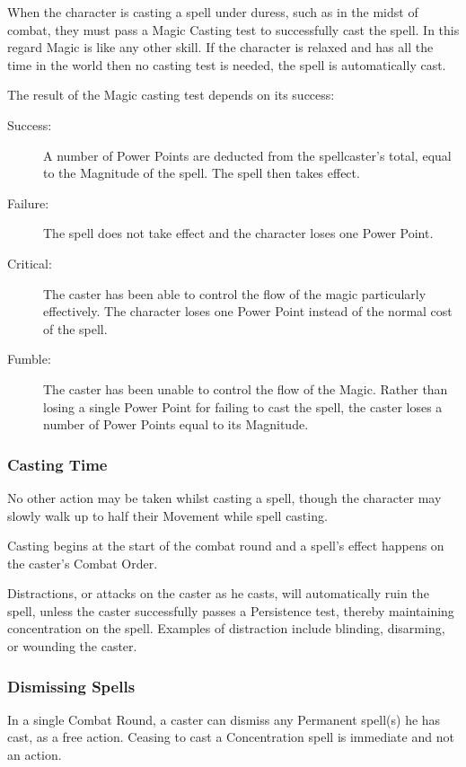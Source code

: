 When the character is casting a spell under duress, such as in the midst of combat, they must pass a Magic Casting test to successfully cast the spell. In this regard Magic is like any other skill. If the character is relaxed and has all the time in the world then no casting test is needed, the spell is automatically cast.

The result of the Magic casting test depends on its success:
\begin{description}
	\item[Success:] A number of Power Points are deducted from the spellcaster’s total, equal to the Magnitude of the spell. The spell then takes effect.
	\item[Failure:] The spell does not take effect and the character loses one Power Point.
	\item[Critical:] The caster has been able to control the flow of the magic particularly effectively. The character loses one Power Point instead of the normal cost of the spell.
	\item[Fumble:] The caster has been unable to control the flow of the Magic. Rather than losing a single Power Point for failing to cast the spell, the caster loses a number of Power Points equal to its Magnitude. 
\end{description}



\subsubsection{Casting Time}
No other action may be taken whilst casting a spell, though the character may slowly walk up to half their Movement while spell casting. %

Casting begins at the start of the combat round and a spell’s effect happens on the caster’s Combat Order.%

Distractions, or attacks on the caster as he casts, will automatically ruin the spell, unless the caster successfully passes a Persistence test, thereby maintaining concentration on the spell. Examples of distraction include blinding, disarming, or wounding the caster.

\subsubsection{Dismissing Spells}
In a single Combat Round, a caster can dismiss any Permanent spell(s) he has cast, as a free action. Ceasing to cast a Concentration spell is immediate and not an action. 


